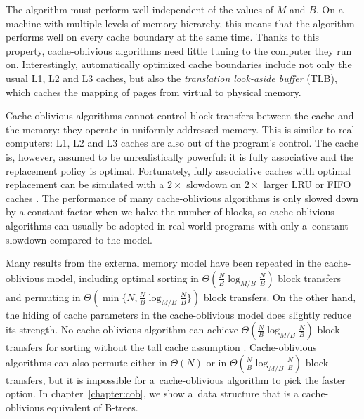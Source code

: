 The algorithm must perform well independent of the values of $M$ and $B$.
On a machine with multiple levels of memory hierarchy, this means that
the algorithm performs well on every cache boundary at the same time.
Thanks to this property, cache-oblivious algorithms need little tuning to the
computer they run on. Interestingly, automatically optimized cache boundaries
include not only the usual L1, L2 and L3 caches, but also the \emph{translation
look-aside buffer} (TLB), which caches the mapping of pages from virtual to
physical memory.

Cache-oblivious algorithms cannot control block transfers between the cache
and the memory: they operate in uniformly addressed memory. This is similar
to real computers: L1, L2 and L3 caches are also out of the program's control.
The cache is, however, assumed to be unrealistically powerful: it is fully
associative and the replacement policy is optimal. Fortunately, fully
associative caches with optimal replacement can be simulated with a
$2\times$ slowdown on $2\times$ larger LRU or FIFO caches
\cite{sleator1985amortized}.
The performance of many cache-oblivious algorithms is only slowed down
by a constant factor when we halve the number of blocks, so cache-oblivious
algorithms can usually be adopted in real world programs with only a~constant
slowdown compared to the model.

Many results from the external memory model have been repeated in the
cache-oblivious model, including optimal sorting in
$\Theta(\frac{N}{B}\log_{M/B}\frac{N}{B})$ block transfers and permuting
in $\Theta(\min\{N,\frac{N}{B}\log_{M/B}\frac{N}{B}\})$ block transfers.
On the other hand, the hiding of cache parameters in the cache-oblivious model
does slightly reduce its strength. No cache-oblivious algorithm can achieve
$\Theta(\frac{N}{B}\log_{M/B}\frac{N}{B})$ block transfers for sorting
without the tall cache assumption \cite{limits-of-co}. Cache-oblivious
algorithms can also permute either in $\Theta(N)$ or in
$\Theta(\frac{N}{B}\log_{M/B}\frac{N}{B})$ block transfers, but it is
impossible for a~cache-oblivious algorithm to pick the faster option.
In chapter~\ref{chapter:cob}, we show a~data structure that is a
cache-oblivious equivalent of B-trees.
